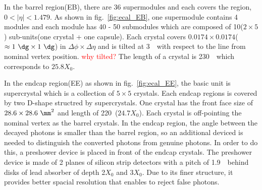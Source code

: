 In the barrel region(EB), there are 36 supermodules and each covers 
the region, $0 < |\eta| < 1.479$. 
As shown in fig.~\ref{fig:ecal_EB}, one supermodule contains 4 modules 
and each module has 40 - 50 submodules 
which are composed of 10($2 \times 5$) sub-units(one crystal + one capsule). 
Each crystal covers $0.0174 \times 0.0174$($\approx 1~\dg \times 1~\dg$)
in $\Delta \phi \times \Delta \eta$ and is tilted at 3~\dg\ with respect to the line 
from nominal vertex position. \textcolor{red}{why tilted?}
The length of a crystal is 230~\mm\ which corresponds to $25.8X_0$.

In the endcap region(EE) as shown in fig.~\ref{fig:ecal_EE}, 
the basic unit is supercrystal which is a collection of $5 \times 5$ crystals. 
Each endcap regions is covered 
by two D-shape structred by supercrystals. 
One crystal has the front face size of $28.6 \times 28.6~\mm^2$ 
and length of 220~\mm($24.7X_0$).
Each crystal is off-pointing the nominal vertex as the barrel crystals.  
In the endcap region, the angle between the decayed photons 
is smaller than the barrel region, so an additional deviced is 
needed to distinguish the converted photons from genuine photons.
In order to do this, a preshower device is placed in front of the endcap crystals. 
The preshower device is made of 2 planes of silicon strip detectors with a pitch of 1.9~\mm\
behind disks of lead absorber of depth 2$X_0$ and 3$X_0$.
Due to its finer structure, it provides better spacial resolution 
that enables to reject false photons.  


